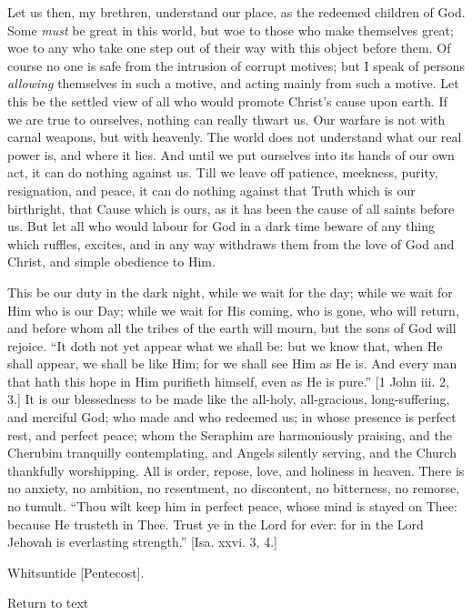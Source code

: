 Let us then, my brethren, understand our place, as the redeemed
children of God. Some \emph{must} be great in this world, but woe to
those who make themselves great; woe to any who take one step out of
their way with this object before them. Of course no one is safe from
the intrusion of corrupt motives; but I speak of persons \emph{allowing}
themselves in such a motive, and acting mainly from such a motive. Let
this be the settled view of all who would promote Christ's cause upon
earth. If we are true to ourselves, nothing can really thwart us. Our
warfare is not with carnal weapons, but with heavenly. The world does
not understand what our real power is, and where it lies. And until we
put ourselves into its hands of our own act, it can do nothing against
us. Till we leave off patience, meekness, purity, resignation, and
peace, it can do nothing against that Truth which is our birthright,
that Cause which is ours, as it has been the cause of all saints
before us. But let all who would labour for God in a dark time beware
of any thing which ruffles, excites, and in any way withdraws them
from the love of God and Christ, and simple obedience to Him.

This be our duty in the dark night, while we wait for the day;
while we wait for Him who is our Day; while we wait for His coming,
who is gone, who will return, and before whom all the tribes of the
earth will mourn, but the sons of God will rejoice. ``It doth not
yet appear what we shall be: but we know that, when He shall appear,
we shall be like Him; for we shall see Him as He is. And every man
that hath this hope in Him purifieth himself, even as He is
pure.'' [1 John iii. 2, 3.] It is our blessedness to be made like
the all-holy, all-gracious, long-suffering, and merciful God; who made
and who redeemed us; in whose presence is perfect rest, and perfect
peace; whom the Seraphim are harmoniously praising, and the Cherubim
tranquilly contemplating, and Angels silently serving, and the Church
thankfully worshipping. All is order, repose, love, and holiness in
heaven. There is no anxiety, no ambition, no resentment, no
discontent, no bitterness, no remorse, no tumult. ``Thou wilt keep
him in perfect peace, whose mind is stayed on Thee: because He
trusteth in Thee. Trust ye in the Lord for ever: for in the Lord
Jehovah is everlasting strength.'' [Isa. xxvi. 3, 4.]


Whitsuntide [Pentecost].

Return to text

